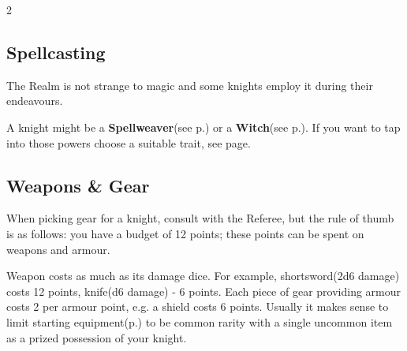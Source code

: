 \begin{multicols*}{2}
\subsection*{Spellcasting}

The Realm is not strange to magic and some knights employ it during their endeavours. 

A knight might be a \textbf{Spellweaver}(see p.\pageref*{sec:spellweaving}) or a \textbf{Witch}(see p.\pageref*{sec:witchcraft}). 
If you want to tap into those powers choose a suitable trait, see page\pageref*{sec:traits}.

\subsection*{Weapons \& Gear}

When picking gear for a knight, consult with the Referee, but the rule of thumb is as follows: you have a budget of 12 points; these points can be spent on weapons and armour. 

Weapon costs as much as its damage dice. For example, shortsword(2d6 damage) costs 12 points, knife(d6 damage) - 6 points. Each piece of gear providing armour costs 2 per armour point, e.g. a shield costs 6 points. 
Usually it makes sense to limit starting equipment(p.\pageref*{sec:gear}) to be common rarity with a single uncommon item as a prized possession of your knight.

\end{multicols*}
